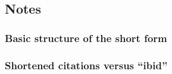 \documentclass[11pt,letterpaper,oneside]{article}
\begin{document}
\begin{citebib}
\item \cite[87-88]{strayed2012}
\item \cite[261, 265]{strayed2012}
\item \cite[32]{daum2015}
\item \cite[134--35]{daum2015}
\item \cite[188]{grazer2015}
\item \cite[190]{grazer2015}
\item \cite[242--55]{garcia1988}
\item \cite[33]{garcia1988}
\item \cite[310]{gould1984a}
\item \cite[309]{gould1984a}
\item \cite[484--85]{bagley2015}
\item \cite[501]{bagley2015}
\item \cite[311]{liu2015}
\item \cite[312]{liu2015}
\end{citebib}

\setcounter{subsection}{1}
\subsection{Notes}
\setcounter{subsection}{14}

\setcounter{subsubsection}{29}
\subsubsection{Basic structure of the short form}
\label{14.30}

\begin{citebib}
\item \cite[24--25]{morley1995}
\item \cite{schwartz1992}
\item \cite{kaiser1964}
\item \cite[43]{morley1995}
\item \cite[138]{schwartz1992}
\item \cite[189--90]{kaiser1964}
\end{citebib}

\setcounter{subsubsection}{33}
\subsubsection{Shortened citations versus ``ibid''}
\label{14.34}
\end{document}
